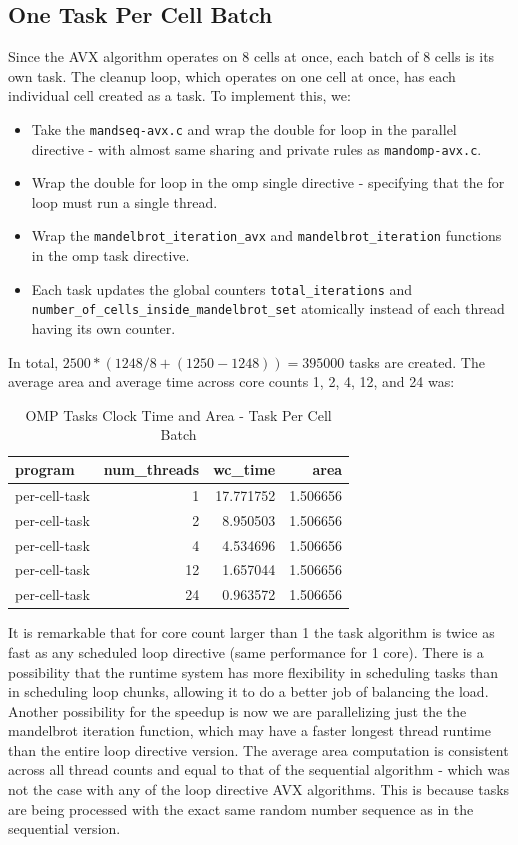 \documentclass{article}
\begin{document}
\subsection{One Task Per Cell Batch}
Since the AVX algorithm operates on 8 cells at once, 
each batch of 8 cells is its own task. The cleanup loop, which operates on one cell at once, has each individual cell 
created as a task. To implement this, we:
\begin{itemize}
    \item Take the \texttt{mandseq-avx.c} and wrap the double for loop in the parallel directive - with almost same sharing and private rules as \texttt{mandomp-avx.c}.
    \item Wrap the double for loop in the omp single directive - specifying that the for loop must run a single thread. 
    \item Wrap the \texttt{mandelbrot\_iteration\_avx} and \texttt{mandelbrot\_iteration} functions in the omp task directive.
    \item Each task updates the global counters \texttt{total\_iterations} and \texttt{number\_of\_cells\_inside\_mandelbrot\_set} atomically instead of each thread having its own counter.
\end{itemize}
In total, $2500 * (1248 / 8 + (1250 - 1248)) = 395000$ tasks are created.
The average area and average time across core counts 1, 2, 4, 12, and 24 was:
\begin{table}[H]
    \centering
    \caption{OMP Tasks Clock Time and Area - Task Per Cell Batch}
    \fontsize{12}{14}\selectfont
    \begin{tabular}[t]{l|r|r|r}
    \hline
    program & num\_threads & wc\_time & area\\
    \hline
    per-cell-task & 1 & 17.771752 & 1.506656\\
    \hline
    per-cell-task & 2 & 8.950503 & 1.506656\\
    \hline
    per-cell-task & 4 & 4.534696 & 1.506656\\
    \hline
    per-cell-task & 12 & 1.657044 & 1.506656\\
    \hline
    per-cell-task & 24 & 0.963572 & 1.506656\\
    \hline
    \end{tabular}
    \end{table}
\noindent It is remarkable that for core count larger than 1 the task algorithm is twice as fast as any scheduled loop directive (same performance for 1 core). 
There is a possibility that the runtime system has more flexibility in scheduling tasks than in scheduling loop chunks, allowing it to do a better job of balancing the load. 
Another possibility for the speedup is now we are parallelizing just the the mandelbrot iteration function, which may have a faster longest thread runtime than the entire 
loop directive version.
The average area computation is consistent across all thread counts and equal to that of the sequential algorithm - which was not the case with any of the 
loop directive AVX algorithms. This is because tasks are being processed with the exact same random number sequence as in the sequential version.
\end{document}

